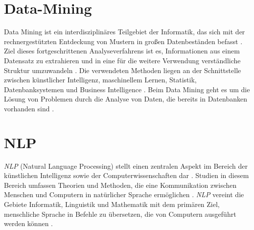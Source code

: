 \section{Data-Mining}
Data Mining ist ein interdisziplinäres Teilgebiet der Informatik, das sich mit der rechnergestützten Entdeckung von Mustern in großen Datenbeständen befasst \cite{jain2013data}. Ziel dieses fortgeschrittenen Analyseverfahrens ist es, Informationen aus einem Datensatz zu extrahieren und in eine für die weitere Verwendung verständliche Struktur umzuwandeln \cite{jain2013data}. Die verwendeten Methoden liegen an der Schnittstelle zwischen künstlicher Intelligenz, maschinellem Lernen, Statistik, Datenbanksystemen und Business Intelligence \cite{jain2013data}. Beim Data Mining geht es um die Lösung von Problemen durch die Analyse von Daten, die bereits in Datenbanken vorhanden sind \cite{jain2013data}.
\section{NLP}
\emph{NLP} (Natural Language Processing) stellt einen zentralen Aspekt im Bereich der künstlichen Intelligenz sowie der Computerwissenschaften dar \cite{kang2020natural}. Studien in diesem Bereich umfassen Theorien und Methoden, die eine Kommunikation zwischen Menschen und Computern in natürlicher Sprache ermöglichen \cite{kang2020natural}. \emph{NLP} vereint die Gebiete Informatik, Linguistik und Mathematik mit dem primären Ziel, menschliche Sprache in Befehle zu übersetzen, die von Computern ausgeführt werden können \cite{kang2020natural}.